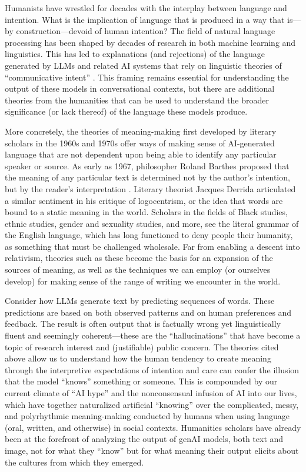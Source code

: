 Humanists have wrestled for decades with the interplay between language and intention.
What is the implication of language that is produced in a way that is---by construction---devoid of human intention?
The field of natural language processing has been shaped by decades of research in both machine learning and linguistics. This has led to explanations (and rejections) of the language generated by LLMs and related AI systems that rely on linguistic theories of ``communicative intent'' \cite{Bender_Gebru_McMillan-Major_Shmitchell_2021}. This framing remains essential for understanding the output of these models in conversational contexts, but there are additional theories from the humanities that can be used to understand the broader significance (or lack thereof) of the language these models produce. 

More concretely, the theories of meaning-making first developed by literary scholars in the 1960s and 1970s offer ways of making sense of AI-generated language that are not dependent upon being able to identify any particular speaker or source. As early as 1967, philosopher Roland Barthes proposed that the meaning of any particular text is determined not by the author’s intention, but by the reader’s interpretation \cite{barthes1977image}. Literary theorist Jacques Derrida \citeyear{Derrida_1998} articulated a similar sentiment in his critique of logocentrism, or the idea that words are bound to a static meaning in the world. Scholars in the fields of Black studies, ethnic studies, gender and sexuality studies, and more, see the literal grammar of the English language, which has long functioned to deny people their humanity, as something that must be challenged wholesale. Far from enabling a descent into relativism, theories such as these become the basis for an expansion of the sources of meaning, as well as the techniques we can employ (or ourselves develop) for making sense of the range of writing we encounter in the world. 

Consider how LLMs generate text by predicting sequences of words. These predictions are based on both observed patterns and on human preferences and feedback. The result is often output that is factually wrong yet linguistically fluent and seemingly coherent---these are the ``hallucinations'' that have become a topic of research interest \cite{koenecke_careless_2024} and (justifiable) public concern. The theories cited above allow us to understand how the human tendency to create meaning through the interpretive expectations of intention and care can confer the illusion that the model ``knows'' something or someone. This is compounded by our current climate of ``AI hype'' and the nonconsensual infusion of AI into our lives, which have together naturalized artificial ``knowing'' over the complicated, messy, and polyrhythmic meaning-making conducted by humans when using language (oral, written, and otherwise) in social contexts. Humanities scholars have already been at the forefront of analyzing the output of genAI models, both text and image, not for what they ``know'' but for what meaning their output elicits about the cultures from which they emerged. 

